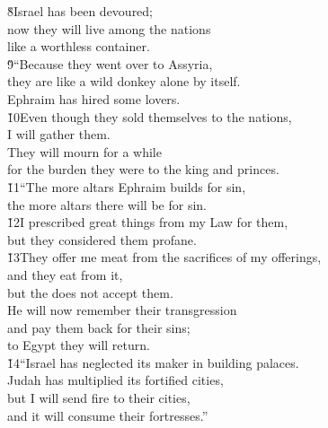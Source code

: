 \begin{poetry}
\poeml \v{8}Israel has been devoured; \\
\poemll    now they will live among the nations \\
\poemlll       like a worthless container. \\
\poeml \v{9}``Because they went over to Assyria, \\
\poemll    they are like a wild donkey alone by itself. \\
\poemlll       Ephraim has hired some lovers. \\
\poeml \v{10}Even though they sold themselves to the nations, \\
\poemll    I will gather them. \\
\poeml They will mourn for a while \\
\poemll    for the burden they were to the king and princes. \\
\poeml \v{11}``The more altars Ephraim builds for sin, \\
\poemll    the more altars there will be for sin. \\
\poeml \v{12}I prescribed great things from my Law for them, \\
\poemll    but they considered them profane. \\
\poeml \v{13}They offer me meat from the sacrifices of my offerings, \\
\poemll    and they eat from it, \\
\poemlll       but the  does not accept them. \\
\poeml He will now remember their transgression \\
\poemll    and pay them back for their sins; \\
\poemlll       to Egypt they will return. \\
\poeml \v{14}``Israel has neglected its maker in building palaces. \\
\poemll    Judah has multiplied its fortified cities, \\
\poeml but I will send fire to their cities, \\
\poemll    and it will consume their fortresses.''
\end{poetry}


